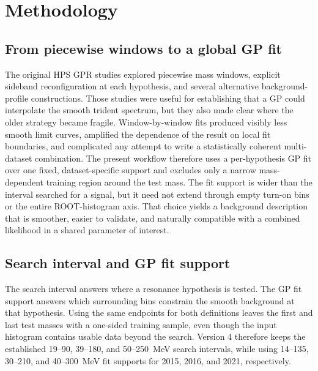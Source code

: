 \section{Methodology}
\label{sec:methodology}

\subsection{From piecewise windows to a global GP fit}

The original HPS GPR studies explored piecewise mass windows, explicit sideband
reconfiguration at each hypothesis, and several alternative background-profile
constructions. Those studies were useful for establishing that a GP could interpolate
the smooth trident spectrum, but they also made clear where the older strategy became
fragile. Window-by-window fits produced visibly less smooth limit curves, amplified the
dependence of the result on local fit boundaries, and complicated any attempt to write
a statistically coherent multi-dataset combination. The present workflow therefore uses
a per-hypothesis GP fit over one fixed, dataset-specific support and excludes only a
narrow mass-dependent training region around the test mass. The fit support is wider
than the interval searched for a signal, but it need not extend through empty turn-on
bins or the entire ROOT-histogram axis. That choice yields a background description
that is smoother, easier to validate, and naturally compatible with a combined
likelihood in a shared parameter of interest.

\subsection{Search interval and GP fit support}
\label{sec:fit-support-policy}

The search interval answers where a resonance hypothesis is tested. The GP fit support
answers which surrounding bins constrain the smooth background at that hypothesis.
Using the same endpoints for both definitions leaves the first and last test masses
with a one-sided training sample, even though the input histogram contains usable
data beyond the search. Version 4 therefore keeps the established 19--90, 39--180,
and 50--250~MeV search intervals, while using 14--135, 30--210, and 40--300~MeV fit
supports for 2015, 2016, and 2021, respectively.

